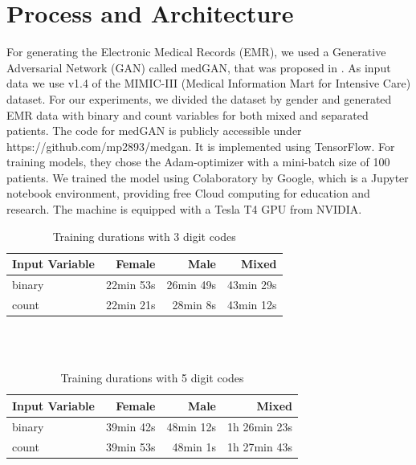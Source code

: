 \documentclass[11pt, a4paper]{book}
\begin{document}
\section{Process and Architecture}
For generating the Electronic Medical Records (EMR), we used a Generative Adversarial Network (GAN) called medGAN, that was proposed in \cite{Choi2017}. As input data we use v1.4 of the MIMIC-III (Medical Information Mart for Intensive Care) dataset. For our experiments, we divided the dataset by gender and generated EMR data with binary and count variables for both mixed and separated patients. The code for medGAN is publicly accessible under https://github.com/mp2893/medgan. It is implemented using TensorFlow.
For training models, they chose the Adam-optimizer with a mini-batch size of 100 patients. \cite{Choi2017} We trained the model using Colaboratory by Google, which is a Jupyter notebook environment, providing free Cloud computing for education and research.
The machine is equipped with a Tesla T4 GPU from NVIDIA.

\begin{table}
\begin{center}
\begin{tabularx}{\textwidth}{X|r|r|r}
Input Variable & Female & Male & Mixed \\
\hline
binary & 22min 53s & 26min 49s & 43min 29s\\
count & 22min 21s & 28min 8s & 43min 12s\\
\end{tabularx}
\caption{Training durations with 3 digit codes}
\end{center}
\end{table}
\\
\\
\begin{table}
\begin{center}
\begin{tabularx}{\textwidth}{X|r|r|r}
Input Variable & Female & Male & Mixed \\
\hline
binary & 39min 42s & 48min 12s & 1h 26min 23s\\
count & 39min 53s & 48min 1s & 1h 27min 43s\\
\end{tabularx}
\caption{Training durations with 5 digit codes}
\end{center}
\end{table}
\end{document}

